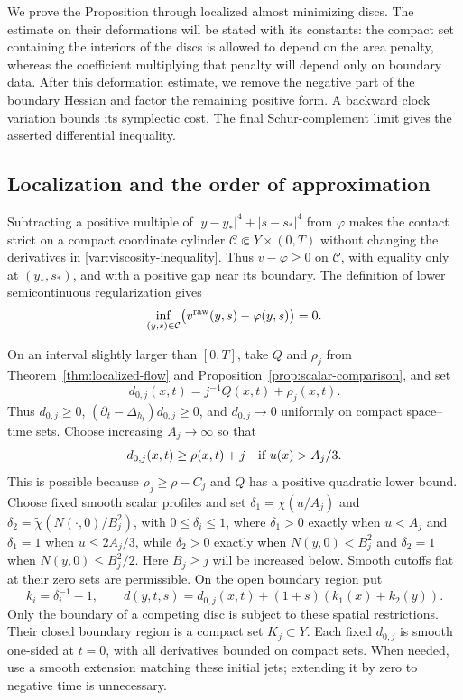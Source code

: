 \documentclass[11pt]{article}
\theoremstyle{definition}
\theoremstyle{remark}
\numberwithin{equation}{section}
\begin{document}
We prove the Proposition through localized almost minimizing discs.
The estimate on their deformations will be stated with its constants:
the compact set containing the interiors of the discs is allowed to
depend on the area penalty, whereas the coefficient multiplying that
penalty will depend only on boundary data.
After this deformation estimate, we remove the negative part of the
boundary Hessian and factor the remaining positive form.  A backward
clock variation bounds its symplectic cost.  The final Schur-complement
limit gives the asserted differential inequality.

\subsection{Localization and the order of approximation}

Subtracting a positive multiple of
$|y-y_*|^4+|s-s_*|^4$ from $\varphi$ makes the contact strict on a compact
coordinate cylinder $\mathcal C\Subset Y\times(0,T)$ without changing
the derivatives in \eqref{var:viscosity-inequality}.
Thus $v-\varphi\ge0$ on $\mathcal C$, with equality only
at $(y_*,s_*)$, and with a positive gap near its boundary.  The definition
of lower semicontinuous regularization gives
\[
 \inf_{(y,s)\in\mathcal C}\bigl(v^{\rm raw}(y,s)-\varphi(y,s)\bigr)=0.
\]

On an interval slightly larger than $[0,T]$, take $Q$ and $\rho_j$ from
Theorem~\ref{thm:localized-flow} and
Proposition~\ref{prop:scalar-comparison}, and set
\begin{equation}
 d_{0,j}(x,t)=j^{-1}Q(x,t)+\rho_j(x,t).
 \label{var:base-cost}
\end{equation}
Thus $d_{0,j}\ge0$, $(\partial_t-\Delta_{h_t})d_{0,j}\ge0$, and
$d_{0,j}\to0$ uniformly on compact space--time sets.  Choose increasing
$A_j\to\infty$ so that
\begin{equation}
 d_{0,j}(x,t)\ge\rho(x,t)+j\quad\hbox{if }u(x)>A_j/3.
 \label{var:tail-wall}
\end{equation}
This is possible because $\rho_j\ge\rho-C_j$ and $Q$ has a positive
quadratic lower bound.  Choose fixed smooth scalar profiles and set
$\delta_1=\chi(u/A_j)$ and
$\delta_2=\widetilde\chi(N(\cdot,0)/B_j^2)$, with
$0\le\delta_i\le1$, where $\delta_1>0$ exactly when $u<A_j$ and
$\delta_1=1$ when $u\le2A_j/3$, while $\delta_2>0$ exactly when
$N(y,0)<B_j^2$ and $\delta_2=1$ when $N(y,0)\le B_j^2/2$.
Here $B_j\ge j$ will be increased below.  Smooth cutoffs flat at their
zero sets are permissible.  On the open boundary region put
\begin{equation}
 k_i=\delta_i^{-1}-1,\qquad
 d(y,t,s)=d_{0,j}(x,t)+(1+s)(k_1(x)+k_2(y)).
 \label{var:wall-cost}
\end{equation}
Only the boundary of a competing disc is subject to these spatial
restrictions.  Their closed boundary region is a compact set $K_j\subset Y$.
Each fixed $d_{0,j}$ is smooth one-sided at $t=0$, with all derivatives
bounded on compact sets.  When needed, use a smooth extension matching
these initial jets; extending it by zero to negative time is unnecessary.
\end{document}
